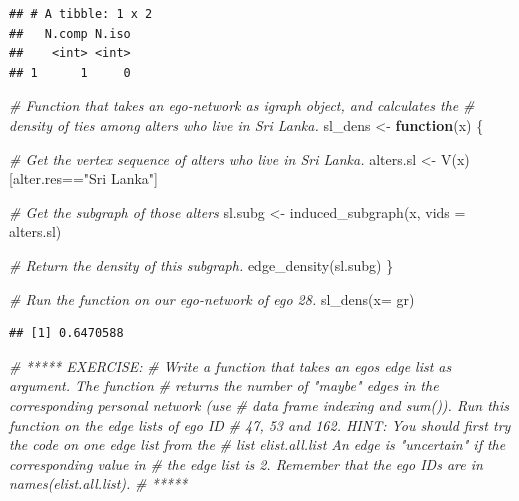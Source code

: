 \documentclass[
]{book}
\newenvironment{Shaded}{\begin{snugshade}}{\end{snugshade}}
\newcommand{\AttributeTok}[1]{\textcolor[rgb]{0.77,0.63,0.00}{#1}}
\newcommand{\CommentTok}[1]{\textcolor[rgb]{0.56,0.35,0.01}{\textit{#1}}}
\newcommand{\ControlFlowTok}[1]{\textcolor[rgb]{0.13,0.29,0.53}{\textbf{#1}}}
\newcommand{\FunctionTok}[1]{\textcolor[rgb]{0.00,0.00,0.00}{#1}}
\newcommand{\NormalTok}[1]{#1}
\newcommand{\OtherTok}[1]{\textcolor[rgb]{0.56,0.35,0.01}{#1}}
\newcommand{\SpecialCharTok}[1]{\textcolor[rgb]{0.00,0.00,0.00}{#1}}
\newcommand{\StringTok}[1]{\textcolor[rgb]{0.31,0.60,0.02}{#1}}
\begin{document}
\begin{verbatim}
## # A tibble: 1 x 2
##   N.comp N.iso
##    <int> <int>
## 1      1     0
\end{verbatim}

\begin{Shaded}
\begin{Highlighting}[]
\CommentTok{\# Function that takes an ego{-}network as igraph object, and calculates the}
\CommentTok{\# density of ties among alters who live in Sri Lanka.}
\NormalTok{sl\_dens }\OtherTok{\textless{}{-}} \ControlFlowTok{function}\NormalTok{(x) \{}
  
  \CommentTok{\# Get the vertex sequence of alters who live in Sri Lanka.}
\NormalTok{  alters.sl }\OtherTok{\textless{}{-}} \FunctionTok{V}\NormalTok{(x)[alter.res}\SpecialCharTok{==}\StringTok{"Sri Lanka"}\NormalTok{]}
  
  \CommentTok{\# Get the subgraph of those alters}
\NormalTok{  sl.subg }\OtherTok{\textless{}{-}} \FunctionTok{induced\_subgraph}\NormalTok{(x, }\AttributeTok{vids =}\NormalTok{ alters.sl) }
  
  \CommentTok{\# Return the density of this subgraph.}
  \FunctionTok{edge\_density}\NormalTok{(sl.subg)}
\NormalTok{\}}

\CommentTok{\# Run the function on our ego{-}network of ego 28.}
\FunctionTok{sl\_dens}\NormalTok{(}\AttributeTok{x=}\NormalTok{ gr)}
\end{Highlighting}
\end{Shaded}

\begin{verbatim}
## [1] 0.6470588
\end{verbatim}

\begin{Shaded}
\begin{Highlighting}[]
\CommentTok{\# ***** EXERCISE: }
\CommentTok{\# Write a function that takes an ego\textquotesingle{}s edge list as argument. The function}
\CommentTok{\# returns the number of "maybe" edges in the corresponding personal network (use}
\CommentTok{\# data frame indexing and sum()). Run this function on the edge lists of ego ID}
\CommentTok{\# 47, 53 and 162. HINT: You should first try the code on one edge list from the}
\CommentTok{\# list elist.all.list An edge is "uncertain" if the corresponding value in}
\CommentTok{\# the edge list is 2. Remember that the ego IDs are in names(elist.all.list).}
\CommentTok{\# *****}
\end{Highlighting}
\end{Shaded}
\end{document}
